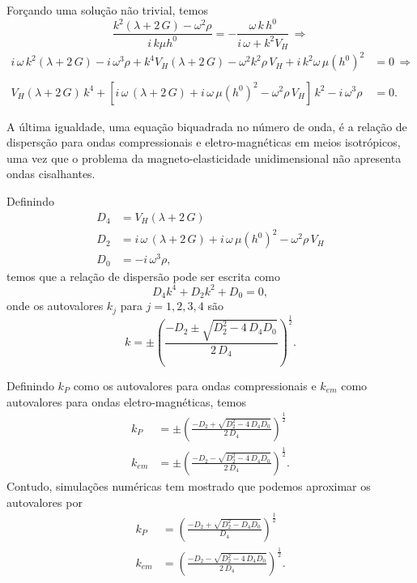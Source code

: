 
For\c{c}ando uma solu\c{c}\~ao n\~ao trivial, temos\\
\begin{equation*}
\frac{k^2(\lambda+2\,G)-\omega^2\rho}{i\,k\mu h^0}=-\frac{\omega\,k\,h^0}{i\,\omega+k^2V_H}\,\Rightarrow
\end{equation*}
\begin{align*}
i\,\omega\,k^2(\lambda+2\,G)-i\,\omega^3\rho+k^4V_H(\lambda+2\,G)-\omega^2k^2\rho\,V_H+i\,k^2\omega\,\mu(h^0)^2&=0\,\Rightarrow\\\\
V_H(\lambda+2\,G)\,k^4+\left[i\,\omega\,(\lambda+2\,G)+i\,\omega\,\mu(h^0)^2-\omega^2\rho\,V_H\right]\,k^2-i\,\omega^3\rho&=0.    
\end{align*}

A \'ultima igualdade, uma equa\c{c}\~ao biquadrada no n\'umero de onda, \'e a rela\c{c}\~ao de dispers\c{c}\~ao para ondas compressionais e eletro-magn\'eticas em meios isotr\'opicos, uma vez que o problema da magneto-elasticidade unidimensional n\~ao apresenta ondas cisalhantes.

Definindo 
\begin{align*}
D_4&=V_H(\lambda+2\,G)\\
D_2&=i\,\omega\,(\lambda+2\,G)+i\,\omega\,\mu(h^0)^2-\omega^2\rho\,V_H\\
D_0&=-i\,\omega^3\rho,
\end{align*}
temos que a rela\c{c}\~ao de dispers\~ao pode ser escrita como
\begin{equation*}
D_4k^4+D_2k^2+D_0=0,
\end{equation*}
onde os autovalores $k_j$ para $j=1,2,3,4$ s\~ao
\begin{equation*}
k=\pm\left(\frac{-D_2\pm\sqrt{D_2^2-4\,D_4D_0}}{2\,D_4}\right)^\frac{1}{2}.
\end{equation*}

Definindo $k_{P}$ como os autovalores para ondas compressionais e $k_{em}$ como autovalores para ondas eletro-magn\'eticas, temos
\begin{align*}
k_{P}&=\pm\left(\frac{-D_2+\sqrt{D_2^2-4\,D_4D_0}}{2\,D_4}\right)^\frac{1}{2}\\
k_{em}&=\pm\left(\frac{-D_2-\sqrt{D_2^2-4\,D_4D_0}}{2\,D_4}\right)^\frac{1}{2}.
\end{align*}
Contudo, simula\c{c}\~oes num\'ericas tem mostrado que podemos aproximar os autovalores por
\begin{align*}
k_{P}&=\left(\frac{-D_2+\sqrt{D_2^2-D_4D_0}}{D_4}\right)^\frac{1}{2}\\
k_{em}&=\left(\frac{-D_2-\sqrt{D_2^2-4\,D_4D_0}}{2\,D_4}\right)^\frac{1}{2}.
\end{align*}


